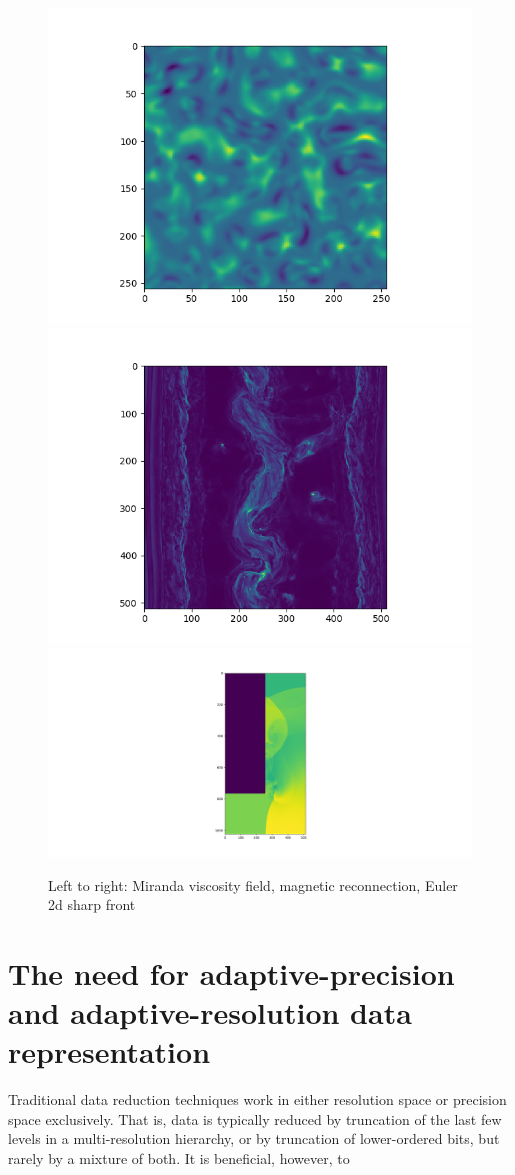 \begin{figure}[!htb]
	\includegraphics[width=0.33\linewidth]{img/dataset/miranda-viscosity.png}
	\includegraphics[width=0.33\linewidth]{img/dataset/magnetic.png}
	\includegraphics[width=0.33\linewidth]{img/dataset/euler2d.png}
	\caption{Left to right: Miranda viscosity field, magnetic reconnection, Euler 2d sharp front}
	\label{fig:datasets}
\end{figure}

\section{The need for adaptive-precision and adaptive-resolution data representation}

Traditional data reduction techniques work in either resolution space or precision space exclusively. That is, data is typically reduced by truncation of the last few levels in a multi-resolution hierarchy, or by truncation of lower-ordered bits, but rarely by a mixture of both. It is beneficial, however, to 

